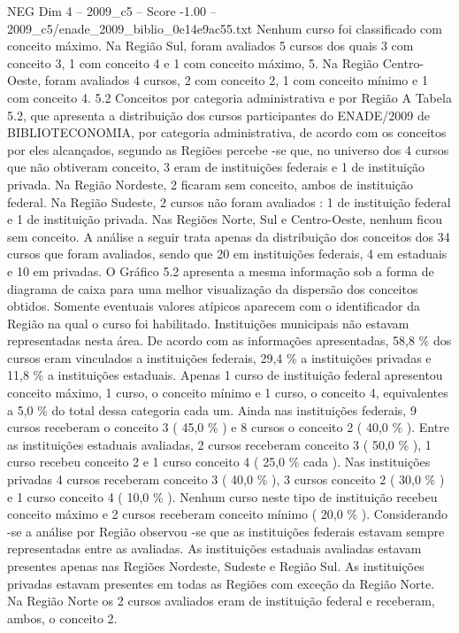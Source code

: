 \begin{textsample}{NEG Dim 4 – 2009\_c5 – Score -1.00 – 2009\_c5/enade\_2009\_biblio\_0e14e9ac55.txt}
Nenhum curso foi classificado com conceito máximo.
Na Região Sul, foram avaliados 5 cursos dos quais 3 com conceito 3, 1 com conceito 4 e 1 com conceito máximo, 5.
Na Região Centro-Oeste, foram avaliados 4 cursos, 2 com conceito 2, 1 com conceito mínimo e 1 com conceito 4. 5.2 Conceitos por categoria administrativa e por Região A Tabela 5.2, que apresenta a distribuição dos cursos participantes do ENADE/2009 de BIBLIOTECONOMIA, por categoria administrativa, de acordo com os conceitos por eles alcançados, segundo as Regiões percebe -se que, no universo dos 4 cursos que não obtiveram conceito, 3 eram de instituições federais e 1 de instituição privada.
Na Região Nordeste, 2 ficaram sem conceito, ambos de instituição federal.
Na Região Sudeste, 2 cursos não foram avaliados : 1 de instituição federal e 1 de instituição privada.
Nas Regiões Norte, Sul e Centro-Oeste, nenhum ficou sem conceito.
A análise a seguir trata apenas da distribuição dos conceitos dos 34 cursos que foram avaliados, sendo que 20 em instituições federais, 4 em estaduais e 10 em privadas.
O Gráfico 5.2 apresenta a mesma informação sob a forma de diagrama de caixa para uma melhor visualização da dispersão dos conceitos obtidos.
Somente eventuais valores atípicos aparecem com o identificador da Região na qual o curso foi habilitado.
Instituições municipais não estavam representadas nesta área.
De acordo com as informações apresentadas, 58,8 \% dos cursos eram vinculados a instituições federais, 29,4 \% a instituições privadas e 11,8 \% a instituições estaduais.
Apenas 1 curso de instituição federal apresentou conceito máximo, 1 curso, o conceito mínimo e 1 curso, o conceito 4, equivalentes a 5,0 \% do total dessa categoria cada um.
Ainda nas instituições federais, 9 cursos receberam o conceito 3 ( 45,0 \% ) e 8 cursos o conceito 2 ( 40,0 \% ).
Entre as instituições estaduais avaliadas, 2 cursos receberam conceito 3 ( 50,0 \% ), 1 curso recebeu conceito 2 e 1 curso conceito 4 ( 25,0 \% cada ).
Nas instituições privadas 4 cursos receberam conceito 3 ( 40,0 \% ), 3 cursos conceito 2 ( 30,0 \% ) e 1 curso conceito 4 ( 10,0 \% ).
Nenhum curso neste tipo de instituição recebeu conceito máximo e 2 cursos receberam conceito mínimo ( 20,0 \% ).
Considerando -se a análise por Região observou -se que as instituições federais estavam sempre representadas entre as avaliadas.
As instituições estaduais avaliadas estavam presentes apenas nas Regiões Nordeste, Sudeste e Região Sul.
As instituições privadas estavam presentes em todas as Regiões com exceção da Região Norte.
Na Região Norte os 2 cursos avaliados eram de instituição federal e receberam, ambos, o conceito 2.

\end{textsample}
